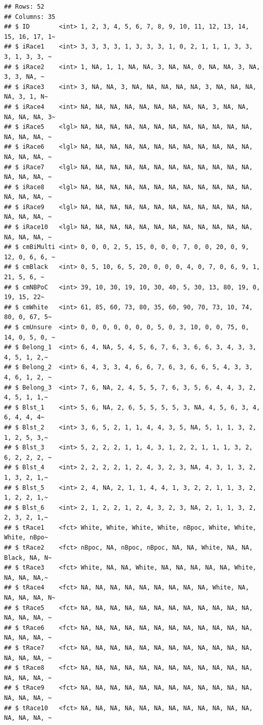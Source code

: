 \documentclass[
  11pt,
]{book}
\begin{document}
\begin{verbatim}
## Rows: 52
## Columns: 35
## $ ID        <int> 1, 2, 3, 4, 5, 6, 7, 8, 9, 10, 11, 12, 13, 14, 15, 16, 17, 1~
## $ iRace1    <int> 3, 3, 3, 3, 1, 3, 3, 3, 1, 0, 2, 1, 1, 1, 3, 3, 3, 1, 3, 3, ~
## $ iRace2    <int> 1, NA, 1, 1, NA, NA, 3, NA, NA, 0, NA, NA, 3, NA, 3, 3, NA, ~
## $ iRace3    <int> 3, NA, NA, 3, NA, NA, NA, NA, NA, 3, NA, NA, NA, NA, 3, 1, N~
## $ iRace4    <int> NA, NA, NA, NA, NA, NA, NA, NA, NA, 3, NA, NA, NA, NA, NA, 3~
## $ iRace5    <lgl> NA, NA, NA, NA, NA, NA, NA, NA, NA, NA, NA, NA, NA, NA, NA, ~
## $ iRace6    <lgl> NA, NA, NA, NA, NA, NA, NA, NA, NA, NA, NA, NA, NA, NA, NA, ~
## $ iRace7    <lgl> NA, NA, NA, NA, NA, NA, NA, NA, NA, NA, NA, NA, NA, NA, NA, ~
## $ iRace8    <lgl> NA, NA, NA, NA, NA, NA, NA, NA, NA, NA, NA, NA, NA, NA, NA, ~
## $ iRace9    <lgl> NA, NA, NA, NA, NA, NA, NA, NA, NA, NA, NA, NA, NA, NA, NA, ~
## $ iRace10   <lgl> NA, NA, NA, NA, NA, NA, NA, NA, NA, NA, NA, NA, NA, NA, NA, ~
## $ cmBiMulti <int> 0, 0, 0, 2, 5, 15, 0, 0, 0, 7, 0, 0, 20, 0, 9, 12, 0, 6, 6, ~
## $ cmBlack   <int> 0, 5, 10, 6, 5, 20, 0, 0, 0, 4, 0, 7, 0, 6, 9, 1, 21, 5, 6, ~
## $ cmNBPoC   <int> 39, 10, 30, 19, 10, 30, 40, 5, 30, 13, 80, 19, 0, 19, 15, 22~
## $ cmWhite   <int> 61, 85, 60, 73, 80, 35, 60, 90, 70, 73, 10, 74, 80, 0, 67, 5~
## $ cmUnsure  <int> 0, 0, 0, 0, 0, 0, 0, 5, 0, 3, 10, 0, 0, 75, 0, 14, 0, 5, 0, ~
## $ Belong_1  <int> 6, 4, NA, 5, 4, 5, 6, 7, 6, 3, 6, 6, 3, 4, 3, 3, 4, 5, 1, 2,~
## $ Belong_2  <int> 6, 4, 3, 3, 4, 6, 6, 7, 6, 3, 6, 6, 5, 4, 3, 3, 4, 6, 1, 2, ~
## $ Belong_3  <int> 7, 6, NA, 2, 4, 5, 5, 7, 6, 3, 5, 6, 4, 4, 3, 2, 4, 5, 1, 1,~
## $ Blst_1    <int> 5, 6, NA, 2, 6, 5, 5, 5, 5, 3, NA, 4, 5, 6, 3, 4, 6, 4, 4, 4~
## $ Blst_2    <int> 3, 6, 5, 2, 1, 1, 4, 4, 3, 5, NA, 5, 1, 1, 3, 2, 1, 2, 5, 3,~
## $ Blst_3    <int> 5, 2, 2, 2, 1, 1, 4, 3, 1, 2, 2, 1, 1, 1, 3, 2, 6, 2, 2, 2, ~
## $ Blst_4    <int> 2, 2, 2, 2, 1, 2, 4, 3, 2, 3, NA, 4, 3, 1, 3, 2, 1, 3, 2, 1,~
## $ Blst_5    <int> 2, 4, NA, 2, 1, 1, 4, 4, 1, 3, 2, 2, 1, 1, 3, 2, 1, 2, 2, 1,~
## $ Blst_6    <int> 2, 1, 2, 2, 1, 2, 4, 3, 2, 3, NA, 2, 1, 1, 3, 2, 2, 3, 2, 1,~
## $ tRace1    <fct> White, White, White, White, nBpoc, White, White, White, nBpo~
## $ tRace2    <fct> nBpoc, NA, nBpoc, nBpoc, NA, NA, White, NA, NA, Black, NA, N~
## $ tRace3    <fct> White, NA, NA, White, NA, NA, NA, NA, NA, White, NA, NA, NA,~
## $ tRace4    <fct> NA, NA, NA, NA, NA, NA, NA, NA, NA, White, NA, NA, NA, NA, N~
## $ tRace5    <fct> NA, NA, NA, NA, NA, NA, NA, NA, NA, NA, NA, NA, NA, NA, NA, ~
## $ tRace6    <fct> NA, NA, NA, NA, NA, NA, NA, NA, NA, NA, NA, NA, NA, NA, NA, ~
## $ tRace7    <fct> NA, NA, NA, NA, NA, NA, NA, NA, NA, NA, NA, NA, NA, NA, NA, ~
## $ tRace8    <fct> NA, NA, NA, NA, NA, NA, NA, NA, NA, NA, NA, NA, NA, NA, NA, ~
## $ tRace9    <fct> NA, NA, NA, NA, NA, NA, NA, NA, NA, NA, NA, NA, NA, NA, NA, ~
## $ tRace10   <fct> NA, NA, NA, NA, NA, NA, NA, NA, NA, NA, NA, NA, NA, NA, NA, ~
\end{verbatim}
\end{document}

